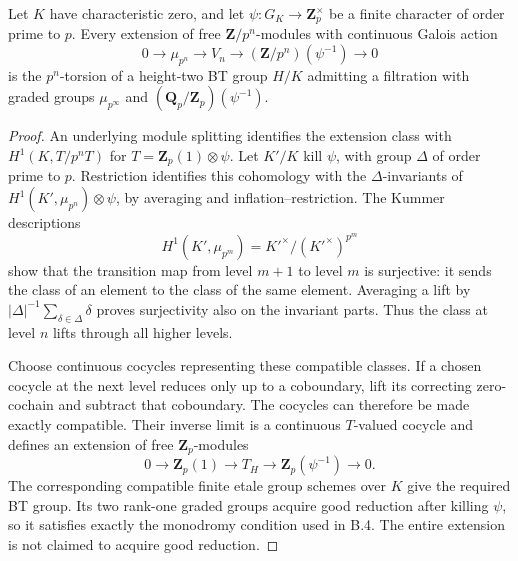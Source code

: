 \begin{lemma}
\label{lem:B-RD62-extension}
Let $K$ have characteristic zero, and let
$\psi:G_K\to\mathbf Z_p^\times$ be a finite character of order
prime to $p$.  Every extension of free $\mathbf Z/p^n$-modules with
continuous Galois action
\[
 0\longrightarrow\mu_{p^n}\longrightarrow V_n
       \longrightarrow(\mathbf Z/p^n)(\psi^{-1})
       \longrightarrow0                               \tag{B-RD62.11}
\]
is the $p^n$-torsion of a height-two BT group $H/K$ admitting a
filtration with graded groups $\mu_{p^\infty}$ and
$(\mathbf Q_p/\mathbf Z_p)(\psi^{-1})$.
\end{lemma}
\begin{proof}
An underlying module splitting identifies the extension class with
$H^1(K,T/p^nT)$ for $T=\mathbf Z_p(1)\otimes\psi$.
Let $K'/K$ kill $\psi$, with group $\Delta$ of order prime to $p$.
Restriction identifies this cohomology with the $\Delta$-invariants
of $H^1(K',\mu_{p^n})\otimes\psi$, by averaging and
inflation--restriction.  The Kummer descriptions
\[
 H^1(K',\mu_{p^m})=K'^\times/(K'^\times)^{p^m}
\]
show that the transition map from level $m+1$ to level $m$ is
surjective: it sends the class of an element to the class of the
same element.  Averaging a lift by $|\Delta|^{-1}\sum_{\delta\in\Delta}\delta$
proves surjectivity also on the invariant parts.  Thus the class
at level $n$ lifts through all higher levels.

Choose continuous cocycles representing these compatible classes.
If a chosen cocycle at the next level reduces only up to a
coboundary, lift its correcting zero-cochain and subtract that
coboundary.  The cocycles can therefore be made exactly compatible.
Their inverse limit is a continuous $T$-valued cocycle and defines
an extension of free $\mathbf Z_p$-modules
\[
 0\longrightarrow\mathbf Z_p(1)\longrightarrow T_H
       \longrightarrow\mathbf Z_p(\psi^{-1})
       \longrightarrow0.
\]
The corresponding compatible finite etale group schemes over $K$
give the required BT group.  Its two rank-one graded groups acquire
good reduction after killing $\psi$, so it satisfies exactly the
monodromy condition used in B.4.  The entire extension is not claimed
to acquire good reduction.
\end{proof}

